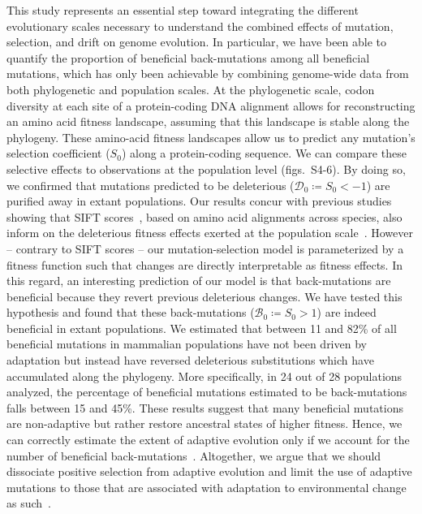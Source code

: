 \documentclass{article}
\newcommand{\Sphy}{S_{0}}
\newcommand{\SphyDel}{\mathcal{D}_0}
\newcommand{\SphyBen}{\mathcal{B}_0}
\begin{document}
    This study represents an essential step toward integrating the different evolutionary scales necessary to understand the combined effects of mutation, selection, and drift on genome evolution.
    In particular, we have been able to quantify the proportion of beneficial back-mutations among all beneficial mutations, which has only been achievable by combining genome-wide data from both phylogenetic and population scales.
    At the phylogenetic scale, codon diversity at each site of a protein-coding DNA alignment allows for reconstructing an amino acid fitness landscape, assuming that this landscape is stable along the phylogeny.
    These amino-acid fitness landscapes allow us to predict any mutation’s selection coefficient ($\Sphy$) along a protein-coding sequence.
    We can compare these selective effects to observations at the population level (figs.~S4-6).
    By doing so, we confirmed that mutations predicted to be deleterious ($\SphyDel \coloneqq \Sphy < -1$) are purified away in extant populations.
    Our results concur with previous studies showing that SIFT scores~\cite{ng_sift_2003, vaser_sift_2016}, based on amino acid alignments across species, also inform on the deleterious fitness effects exerted at the population scale~\cite{chen_hunting_2021}.
    However – contrary to SIFT scores – our mutation-selection model is parameterized by a fitness function such that changes are directly interpretable as fitness effects.
    In this regard, an interesting prediction of our model is that back-mutations are beneficial because they revert previous deleterious changes.
    We have tested this hypothesis and found that these back-mutations ($\SphyBen \coloneqq \Sphy > 1 $) are indeed beneficial in extant populations.
    We estimated that between 11 and 82\% of all beneficial mutations in mammalian populations have not been driven by adaptation but instead have reversed deleterious substitutions which have accumulated along the phylogeny.
    More specifically, in 24 out of 28 populations analyzed, the percentage of beneficial mutations estimated to be back-mutations falls between 15 and 45\%.
    These results suggest that many beneficial mutations are non-adaptive but rather restore ancestral states of higher fitness.
    Hence, we can correctly estimate the extent of adaptive evolution only if we account for the number of beneficial back-mutations~\cite{keightley_what_2010, rice_evolutionarily_2015}.
    Altogether, we argue that we should dissociate positive selection from adaptive evolution and limit the use of adaptive mutations to those that are associated with adaptation to environmental change as such~\cite{charlesworth_other_2007, mustonen_fitness_2009}.
\end{document}
